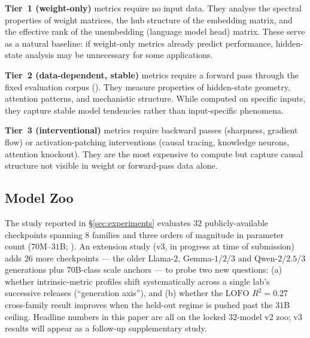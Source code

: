 \documentclass[preprint]{neurips_2025}
\begin{document}
\textbf{Tier~1 (weight-only)} metrics require no input data. They analyse the spectral properties of weight matrices, the hub structure of the embedding matrix, and the effective rank of the unembedding (language model head) matrix. These serve as a natural baseline: if weight-only metrics already predict performance, hidden-state analysis may be unnecessary for some applications.

\textbf{Tier~2 (data-dependent, stable)} metrics require a forward pass through the fixed evaluation corpus (). They measure properties of hidden-state geometry, attention patterns, and mechanistic structure. While computed on specific inputs, they capture stable model tendencies rather than input-specific phenomena.

\textbf{Tier~3 (interventional)} metrics require backward passes (sharpness, gradient flow) or activation-patching interventions (causal tracing, knowledge neurons, attention knockout). They are the most expensive to compute but capture causal structure not visible in weight or forward-pass data alone.

\subsection{Model Zoo}
\label{sec:models}

The study reported in \S\ref{sec:experiments} evaluates $32$ publicly-available checkpoints spanning $8$ families and three orders of magnitude in parameter count ($70$M--$31$B; ). An extension study (v3, in progress at time of submission) adds $26$ more checkpoints --- the older Llama-$2$, Gemma-$1$/$2$/$3$ and Qwen-$2$/$2.5$/$3$ generations plus $70$B-class scale anchors --- to probe two new questions: (a) whether intrinsic-metric profiles shift systematically across a single lab's successive releases (``generation axis''), and (b) whether the $\text{LOFO } R^2 = 0.27$ cross-family result improves when the held-out regime is pushed past the $31$B ceiling. Headline numbers in this paper are all on the locked $32$-model v2 zoo; v3 results will appear as a follow-up supplementary study.
\end{document}
